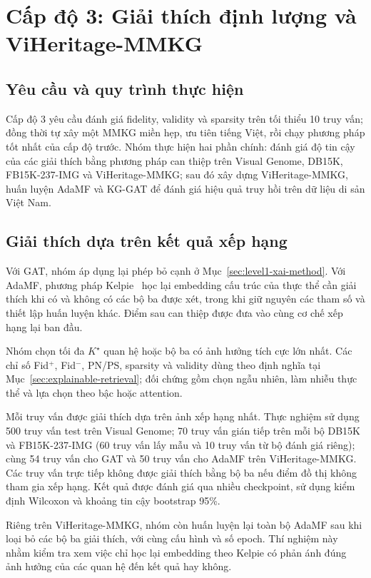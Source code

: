 \chapter{Cấp độ 3: Giải thích định lượng và ViHeritage-MMKG}
\label{chap:level3}
\label{chap:results}

\section{Yêu cầu và quy trình thực hiện}
\label{sec:level3-methodology}

Cấp độ 3 yêu cầu đánh giá fidelity, validity và sparsity trên tối thiểu 10 truy vấn; đồng thời tự xây một MMKG miền hẹp, ưu tiên tiếng Việt, rồi chạy phương pháp tốt nhất của cấp độ trước.
Nhóm thực hiện hai phần chính: đánh giá độ tin cậy của các giải thích bằng phương pháp can thiệp trên Visual Genome, DB15K, FB15K-237-IMG và ViHeritage-MMKG; sau đó xây dựng ViHeritage-MMKG, huấn luyện AdaMF và KG-GAT để đánh giá hiệu quả truy hồi trên dữ liệu di sản Việt Nam.

\section{Giải thích dựa trên kết quả xếp hạng}

Với GAT, nhóm áp dụng lại phép bỏ cạnh ở Mục~\ref{sec:level1-xai-method}. Với AdaMF, phương pháp Kelpie~\cite{rossi2022kelpie} học lại embedding cấu trúc của thực thể cần giải thích khi có và không có các bộ ba được xét, trong khi giữ nguyên các tham số và thiết lập huấn luyện khác. Điểm sau can thiệp được đưa vào cùng cơ chế xếp hạng lại ban đầu.

Nhóm chọn tối đa $K^\star$ quan hệ hoặc bộ ba có ảnh hưởng tích cực lớn nhất. Các chỉ số Fid$^+$, Fid$^-$, PN/PS, sparsity và validity dùng theo định nghĩa tại Mục~\ref{sec:explainable-retrieval}; đối chứng gồm chọn ngẫu nhiên, làm nhiễu thực thể và lựa chọn theo bậc hoặc attention.

Mỗi truy vấn được giải thích dựa trên ảnh xếp hạng nhất. Thực nghiệm sử dụng 500 truy vấn test trên Visual Genome; 70 truy vấn gián tiếp trên mỗi bộ DB15K và FB15K-237-IMG (60 truy vấn lấy mẫu và 10 truy vấn từ bộ đánh giá riêng); cùng 54 truy vấn cho GAT và 50 truy vấn cho AdaMF trên ViHeritage-MMKG. Các truy vấn trực tiếp không được giải thích bằng bộ ba nếu điểm đồ thị không tham gia xếp hạng. Kết quả được đánh giá qua nhiều checkpoint, sử dụng kiểm định Wilcoxon và khoảng tin cậy bootstrap 95\%.

Riêng trên ViHeritage-MMKG, nhóm còn huấn luyện lại toàn bộ AdaMF sau khi loại bỏ các bộ ba giải thích, với cùng cấu hình và số epoch. Thí nghiệm này nhằm kiểm tra xem việc chỉ học lại embedding theo Kelpie có phản ánh đúng ảnh hưởng của các quan hệ đến kết quả hay không.

